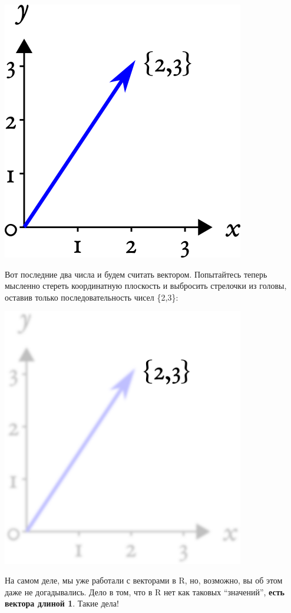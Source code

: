 \documentclass[
]{book}
\begin{document}
\includegraphics[width=4.16667in,height=\textheight]{images/coord_vector.png}

Вот последние два числа и будем считать вектором. Попытайтесь теперь мысленно стереть координатную плоскость и выбросить стрелочки из головы, оставив только последовательность чисел \{2,3\}:

\includegraphics[width=4.16667in,height=\textheight]{images/coord_vector_blur.png}

На самом деле, мы уже работали с векторами в R, но, возможно, вы об этом даже не догадывались. Дело в том, что в R нет как таковых ``значений'', \textbf{есть вектора длиной 1}. Такие дела!
\end{document}
